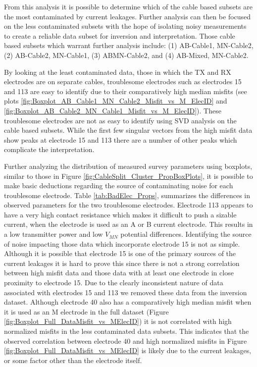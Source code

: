 \documentclass[final,authoryear,5p,times,twocolumn]{elsarticle}
\begin{document}
From this analysis it is possible to determine which of the cable based subsets are the most contaminated by current leakages. Further analysis can then be focused on the less contaminated subsets with the hope of isolating noisy measurements to create a reliable data subset for inversion and interpretation. Those cable based subsets which warrant further analysis include: (1) AB-Cable1, MN-Cable2, (2) AB-Cable2, MN-Cable1, (3) ABMN-Cable2, and (4) AB-Mixed, MN-Cable2.

By looking at the least contaminated data, those in which the TX and RX electrodes are on separate cables, troublesome electrodes such as electrodes 15 and 113 are easy to identify due to their comparatively high median misfits (see plots \ref{fig:Boxplot_AB_Cable1_MN_Cable2_Misfit_vs_M_ElecID} and \ref{fig:Boxplot_AB_Cable2_MN_Cable1_Misfit_vs_M_ElecID}). These troublesome electrodes are not as easy to identify using SVD analysis on the cable based subsets. While the first few singular vectors from the high misfit data show peaks at electrode 15 and 113 there are a number of other peaks which complicate the interpretation. 

Further analyzing the distribution of measured survey parameters using boxplots, similar to those in Figure \ref{fig:CableSplit_Cluster_PropBoxPlots}, it is possible to make basic deductions regarding the source of contaminating noise for each troublesome electrode. Table \ref{tab:BadElec_Props}, summarizes the differences in observed parameters for the two troublesome electrodes. Electrode 113 appears to have a very high contact resistance which makes it difficult to push a sizable current, when the electrode is used as an A or B current electrode. This results in a low transmitter power and low $V_{MN}$ potential differences. Identifying the source of noise impacting those data which incorporate electrode 15 is not as simple. Although it is possible that electrode 15 is one of the primary sources of the current leakages it is hard to prove this since there is not a strong correlation between high misfit data and those data with at least one electrode in close proximity to electrode 15. Due to the clearly inconsistent nature of data associated with electrodes 15 and 113 we removed these data from the inversion dataset. Although electrode 40 also has a comparatively high median misfit when it is used as an M electrode in the full dataset (Figure \ref{fig:Boxplot_Full_DataMisfit_vs_MElecID}) it is not correlated with high normalized misfits in the less contaminated data subsets. This indicates that the observed correlation between electrode 40 and high normalized misfits in Figure \ref{fig:Boxplot_Full_DataMisfit_vs_MElecID} is likely due to the current leakages, or some factor other than the electrode itself.
\end{document}
